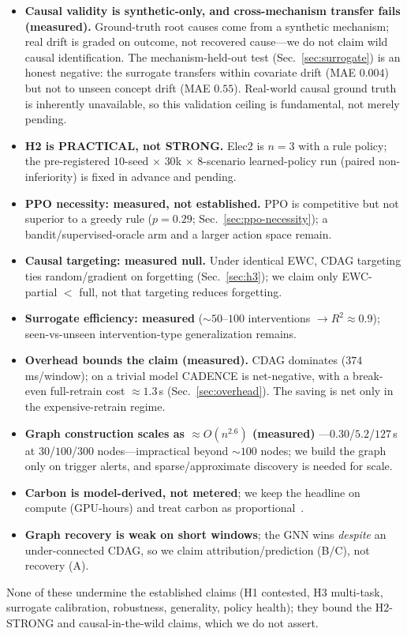 \documentclass[conference]{IEEEtran}
\begin{document}
\begin{itemize}
\item \textbf{Causal validity is synthetic-only, and cross-mechanism
transfer fails (measured).} Ground-truth root causes come from a
synthetic mechanism; real drift is graded on outcome, not recovered
cause---we do not claim wild causal identification. The
mechanism-held-out test (Sec.~\ref{sec:surrogate}) is an honest negative:
the surrogate transfers within covariate drift (MAE $0.004$) but not to
unseen concept drift (MAE $0.55$). Real-world causal ground truth is
inherently unavailable, so this validation ceiling is fundamental, not
merely pending.
\item \textbf{H2 is PRACTICAL, not STRONG.} Elec2 is $n{=}3$ with a rule
policy; the pre-registered $10$-seed $\times$ $30$k $\times$ $8$-scenario
learned-policy run (paired non-inferiority) is fixed in advance and
pending.
\item \textbf{PPO necessity: measured, not established.} PPO is
competitive but not superior to a greedy rule ($p=0.29$;
Sec.~\ref{sec:ppo-necessity}); a bandit/supervised-oracle arm and a larger
action space remain.
\item \textbf{Causal targeting: measured null.} Under identical EWC, CDAG
targeting ties random/gradient on forgetting (Sec.~\ref{sec:h3}); we claim
only EWC-partial $<$ full, not that targeting reduces forgetting.
\item \textbf{Surrogate efficiency: measured} ($\sim\!50$--$100$
interventions $\to R^2\!\approx\!0.9$); seen-vs-unseen intervention-type
generalization remains.
\item \textbf{Overhead bounds the claim (measured).} CDAG dominates
($374$\,ms/window); on a trivial model CADENCE is net-negative, with a
break-even full-retrain cost $\approx1.3$\,s (Sec.~\ref{sec:overhead}).
The saving is net only in the expensive-retrain regime.
\item \textbf{Graph construction scales as $\approx O(n^{2.6})$ (measured)}
---$0.30$/$5.2$/$127$\,s at $30$/$100$/$300$ nodes---impractical beyond
$\sim\!100$ nodes; we build the graph only on trigger alerts, and
sparse/approximate discovery is needed for scale.
\item \textbf{Carbon is model-derived, not metered}; we keep the headline
on compute (GPU-hours) and treat carbon as
proportional~\cite{lacoste2019quantifying,patterson2021carbon}.
\item \textbf{Graph recovery is weak on short windows}; the GNN wins
\emph{despite} an under-connected CDAG, so we claim attribution/prediction
(B/C), not recovery (A).
\end{itemize}
None of these undermine the established claims (H1 contested, H3
multi-task, surrogate calibration, robustness, generality, policy health);
they bound the H2-STRONG and causal-in-the-wild claims, which we do not
assert.
\end{document}
